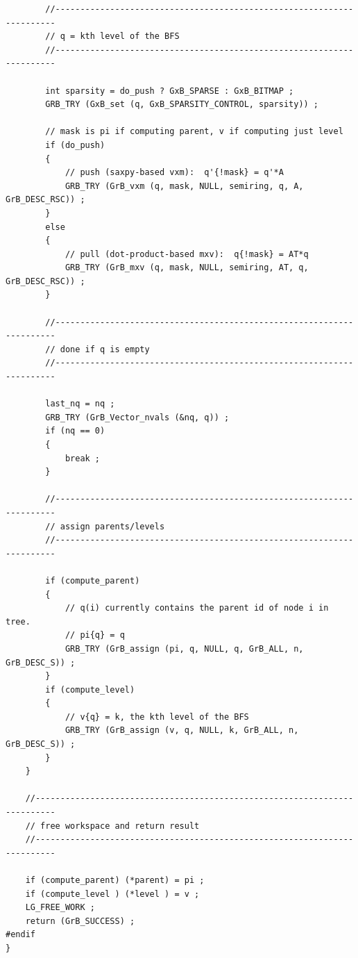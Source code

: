 \begin{verbatim}
        //----------------------------------------------------------------------
        // q = kth level of the BFS
        //----------------------------------------------------------------------

        int sparsity = do_push ? GxB_SPARSE : GxB_BITMAP ;
        GRB_TRY (GxB_set (q, GxB_SPARSITY_CONTROL, sparsity)) ;

        // mask is pi if computing parent, v if computing just level
        if (do_push)
        {
            // push (saxpy-based vxm):  q'{!mask} = q'*A
            GRB_TRY (GrB_vxm (q, mask, NULL, semiring, q, A, GrB_DESC_RSC)) ;
        }
        else
        {
            // pull (dot-product-based mxv):  q{!mask} = AT*q
            GRB_TRY (GrB_mxv (q, mask, NULL, semiring, AT, q, GrB_DESC_RSC)) ;
        }

        //----------------------------------------------------------------------
        // done if q is empty
        //----------------------------------------------------------------------

        last_nq = nq ;
        GRB_TRY (GrB_Vector_nvals (&nq, q)) ;
        if (nq == 0)
        {
            break ;
        }

        //----------------------------------------------------------------------
        // assign parents/levels
        //----------------------------------------------------------------------

        if (compute_parent)
        {
            // q(i) currently contains the parent id of node i in tree.
            // pi{q} = q
            GRB_TRY (GrB_assign (pi, q, NULL, q, GrB_ALL, n, GrB_DESC_S)) ;
        }
        if (compute_level)
        {
            // v{q} = k, the kth level of the BFS
            GRB_TRY (GrB_assign (v, q, NULL, k, GrB_ALL, n, GrB_DESC_S)) ;
        }
    }

    //--------------------------------------------------------------------------
    // free workspace and return result
    //--------------------------------------------------------------------------

    if (compute_parent) (*parent) = pi ;
    if (compute_level ) (*level ) = v ;
    LG_FREE_WORK ;
    return (GrB_SUCCESS) ;
#endif
}
\end{verbatim}
